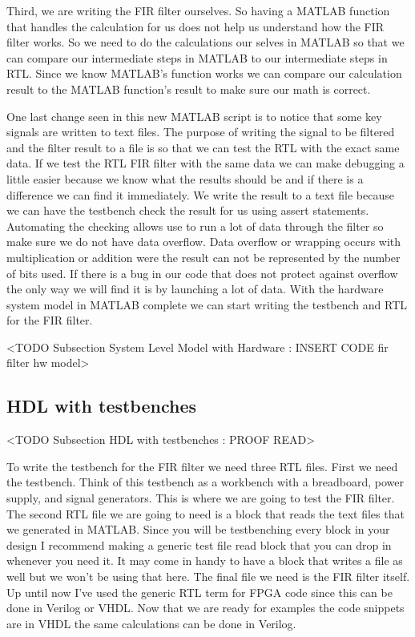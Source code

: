Third, we are writing the \ac{FIR} filter ourselves. So having a MATLAB function that handles the calculation for us does not help us understand how the \ac{FIR} filter works. So we need to do the calculations our selves in MATLAB so that we can compare our intermediate steps in MATLAB to our intermediate steps in \ac{RTL}. Since we know MATLAB's function works we can compare our calculation result to the MATLAB function's result to make sure our math is correct.

One last change seen in this new MATLAB script is to notice that some key signals are written to text files. The purpose of writing the signal to be filtered and the filter result to a file is so that we can test the \ac{RTL} with the exact same data. If we test the \ac{RTL} \ac{FIR} filter with the same data we can make debugging a little easier because we know what the results should be and if there is a difference we can find it immediately. We write the result to a text file because we can have the testbench check the result for us using assert statements. Automating the checking allows use to run a lot of data through the filter so make sure we do not have data overflow. Data overflow or wrapping occurs with multiplication or addition were the result can not be represented by the number of bits used. If there is a bug in our code that does not protect against overflow the only way we will find it is by launching a lot of data.  With the hardware system model in MATLAB complete we can start writing the testbench and \ac{RTL} for the \ac{FIR} filter.

	<TODO Subsection System Level Model with Hardware : INSERT CODE fir filter hw model>
	
\subsection{HDL with testbenches}
	<TODO Subsection HDL with testbenches : PROOF READ>

To write the testbench for the \ac{FIR} filter we need three \ac{RTL} files. First we need the testbench. Think of this testbench as a workbench with a breadboard, power supply, and signal generators. This is where we are going to test the \ac{FIR} filter. The second \ac{RTL} file we are going to need is a block that reads the text files that we generated in MATLAB. Since you will be testbenching every block in your design I recommend making a generic test file read block that you can drop in whenever you need it. It may come in handy to have a block that writes a file as well but we won't be using that here. The final file we need is the \ac{FIR} filter itself. Up until now I've used the generic \ac{RTL} term for \ac{FPGA} code since this can be done in Verilog or \ac{VHDL}. Now that we are ready for examples the code snippets are in \ac{VHDL} the same calculations can be done in Verilog.

